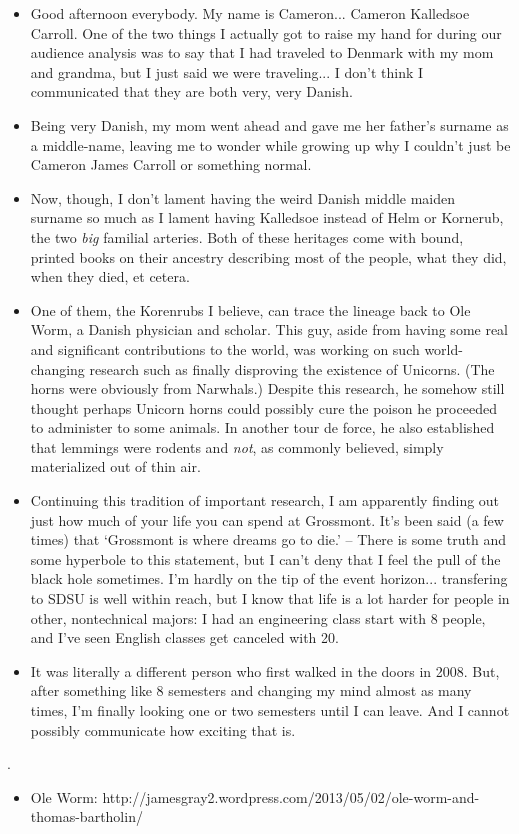 \documentclass{article}
\begin{document}
  \begin{itemize}
    \item Good afternoon everybody. My name is Cameron... Cameron Kalledsoe Carroll. One of the two things I actually got to raise my hand for during our audience analysis was to say that I had traveled to Denmark with my mom and grandma, but I just said we were traveling... I don't think I communicated that they are both very, very Danish. 
    \item Being very Danish, my mom went ahead and gave me her father's surname as a middle-name, leaving me to wonder while growing up why I couldn't just be Cameron James Carroll or something normal.
    \item Now, though, I don't lament having the weird Danish middle maiden surname so much as I lament having Kalledsoe instead of Helm or Kornerub, the two \emph{big} familial arteries. Both of these heritages come with bound, printed books on their ancestry describing most of the people, what they did, when they died, et cetera.
    \item One of them, the Korenrubs I believe, can trace the lineage back to Ole Worm, a Danish physician and scholar. This guy, aside from having some real and significant contributions to the world, was working on such world-changing research such as finally disproving the existence of Unicorns. (The horns were obviously from Narwhals.) Despite this research, he somehow still thought perhaps Unicorn horns could possibly cure the poison he proceeded to administer to some animals. In another tour de force, he also established that lemmings were rodents and \emph{not}, as commonly believed, simply materialized out of thin air.
    \item Continuing this tradition of important research, I am apparently finding out just how much of your life you can spend at Grossmont. It's been said (a few times) that `Grossmont is where dreams go to die.' -- There is some truth and some hyperbole to this statement, but I can't deny that I feel the pull of the black hole sometimes. I'm hardly on the tip of the event horizon... transfering to SDSU is well within reach, but I know that life is a lot harder for people in other, nontechnical majors: I had an engineering class start with 8 people, and I've seen English classes get canceled with 20.
    \item It was literally a different person who first walked in the doors in 2008. But, after something like 8 semesters and changing my mind almost as many times, I'm finally looking one or two semesters until I can leave. And I cannot possibly communicate how exciting that is.
  \end{itemize}
  
.
  \begin{itemize}
    \item Ole Worm: http://jamesgray2.wordpress.com/2013/05/02/ole-worm-and-thomas-bartholin/ 
  \end{itemize}
  
\end{document}
